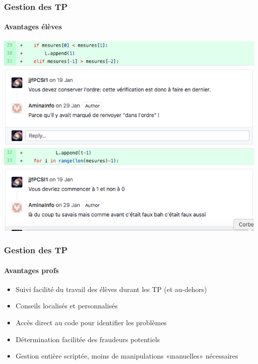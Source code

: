\begin{frame}
	\frametitle{Gestion des TP}
	\framesubtitle{Avantages élèves}

	\begin{center}
		\includegraphics[width=0.8\linewidth]{figures/TP_note_info.png}
	\end{center}

\end{frame}

\begin{frame}
	\frametitle{Gestion des TP}
	\framesubtitle{Avantages profs}

	\begin{itemize}[<+->]
		\item Suivi facilité du travail des élèves durant les TP (et au-dehors)

		\item Conseils localisés et personnalisés

		\item Accès direct au code pour identifier les problèmes

		\item Détermination facilitée des fraudeurs potentiels

		\item Gestion entière scriptée, moins de manipulations «manuelles» nécessaires

	\end{itemize}

\end{frame}
